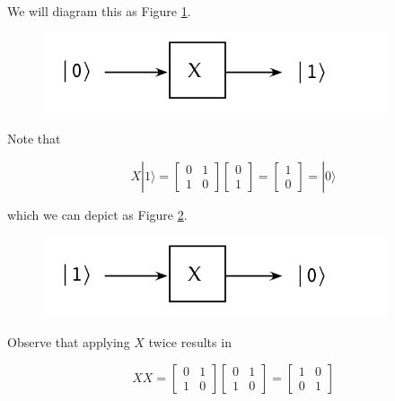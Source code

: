 \documentclass[main.tex]{subfiles}
\begin{document}
    We will diagram this as Figure \ref{fig:19gate4}.
    
    \begin{figure}
        \centering
        \includegraphics[width=4in]{notes/figs/n05/19gate1.png}
        \caption{}
        \label{fig:19gate4}
    \end{figure}
    
    Note that
    
    $$
    X|1\rangle=\left[\begin{array}{ll}
    0 & 1 \\
    1 & 0
    \end{array}\right]\left[\begin{array}{l}
    0 \\
    1
    \end{array}\right]=\left[\begin{array}{l}
    1 \\
    0
    \end{array}\right]=|0\rangle
    $$
    
    which we can depict as Figure \ref{fig:20polarizer1}.
    
    \begin{figure}
        \centering
        \includegraphics[width=4in]{notes/figs/n05/20gate2.png}
        \caption{}
        \label{fig:20polarizer1}
    \end{figure}
    
    Observe that applying $X$ twice results in
    
    $$
    X X=\left[\begin{array}{ll}
    0 & 1 \\
    1 & 0
    \end{array}\right]\left[\begin{array}{ll}
    0 & 1 \\
    1 & 0
    \end{array}\right]=\left[\begin{array}{ll}
    1 & 0 \\
    0 & 1
    \end{array}\right]
    $$
\end{document}
